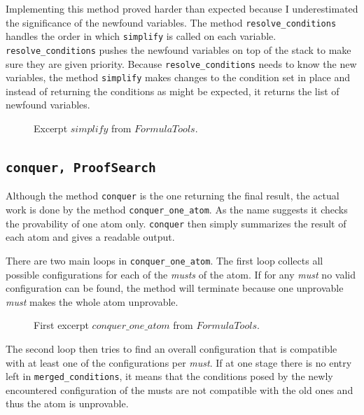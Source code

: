 Implementing this method proved harder than expected because I underestimated the significance of the newfound variables. The method \texttt{resolve\_conditions} handles the order in which \texttt{simplify} is called on each variable. \texttt{resolve\_conditions} pushes the newfound variables on top of the stack to make sure they are given priority. Because \texttt{resolve\_conditions} needs to know the new variables, the method \texttt{simplify} makes changes to the condition set in place and instead of returning the conditions as might be expected, it returns the list of newfound variables.

\begin{figure}[H]
	\vspace{-10pt}
	
	\vspace{-10pt}
	\caption{Excerpt $simplify$ from $FormulaTools$.}
\end{figure}


\subsection[conquer]{\texttt{conquer, ProofSearch}}
Although the method \texttt{conquer} is the one returning the final result, the actual work is done by the method \texttt{conquer\_one\_atom}. As the name suggests it checks the provability of one atom only. \texttt{conquer} then simply summarizes the result of each atom and gives a readable output.

There are two main loops in \texttt{conquer\_one\_atom}. The first loop collects all possible configurations for each of the \emph{musts} of the atom. If for any \emph{must} no valid configuration can be found, the method will terminate because one unprovable \emph{must} makes the whole atom unprovable.

\begin{figure}[H]
	\vspace{-10pt}
	
	\vspace{-10pt}
	\caption{First excerpt $conquer\_one\_ atom$ from $FormulaTools$.}
\end{figure}

The second loop then tries to find an overall configuration that is compatible with at least one of the configurations per \emph{must}. If at one stage there is no entry left in \texttt{merged\_conditions}, it means that the conditions posed by the newly encountered configuration of the musts are not compatible with the old ones and thus the atom is unprovable.

